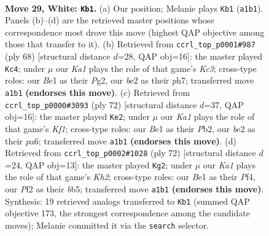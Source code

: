 \documentclass[11pt]{article}
\begin{document}
\clearpage

\begin{figure}[p]\centering
\begin{subfigure}{0.46\textwidth}\centering
\resizebox{\linewidth}{!}{%
\newchessgame
\chessboard[
  setfen={4k3/8/6N1/2pp1p2/3n4/1p6/1P2bP2/K3B2B w - - 0 29},
  showmover=false,
  pgfstyle=straightmove, color=movearrow, markmove={a1-b1}
]}
\caption{}
\end{subfigure}\hfill
\begin{subfigure}{0.46\textwidth}\centering
\resizebox{\linewidth}{!}{%
\newchessgame
\chessboard[
  setfen={8/4p2p/4n3/2p1k1p1/8/1PK1B2P/5PP1/8 w - - 0 35},
  showmover=false,
  pgfstyle=straightmove, color=movearrow, markmove={c3-c4}
]}
\caption{}
\end{subfigure}
\\[4pt]
\begin{subfigure}{0.46\textwidth}\centering
\resizebox{\linewidth}{!}{%
\newchessgame
\chessboard[
  setfen={8/2k4p/pp6/4n3/6p1/4B1P1/PP3P2/5K2 w - - 0 37},
  showmover=false,
  pgfstyle=straightmove, color=movearrow, markmove={f1-e2}
]}
\caption{}
\end{subfigure}\hfill
\begin{subfigure}{0.46\textwidth}\centering
\resizebox{\linewidth}{!}{%
\newchessgame
\chessboard[
  setfen={6k1/1B2pp2/6p1/1bB2n2/1P3P2/7P/7K/8 w - - 2 37},
  showmover=false,
  pgfstyle=straightmove, color=movearrow, markmove={h2-g2}
]}
\caption{}
\end{subfigure}
\caption{\textbf{Move 29, White: \texttt{Kb1}.} (a) Our position; Melanie plays \texttt{Kb1} (\texttt{a1b1}). Panels (b)--(d) are the retrieved master positions whose correspondence most drove this move (highest QAP objective among those that transfer to it). (b) Retrieved from \texttt{ccrl\_top\_p0001\#987} (ply 68) [structural distance $d$=28, QAP obj=16]: the master played \texttt{Kc4}; under $\mu$ our \emph{Ka1} plays the role of that game's \emph{Kc3}; cross-type roles: our \emph{B}e1 as their \emph{P}g2, our \emph{b}e2 as their \emph{p}h7; transferred move \texttt{a1b1} \textbf{(endorses this move)}. (c) Retrieved from \texttt{ccrl\_top\_p0000\#3093} (ply 72) [structural distance $d$=37, QAP obj=16]: the master played \texttt{Ke2}; under $\mu$ our \emph{Ka1} plays the role of that game's \emph{Kf1}; cross-type roles: our \emph{B}e1 as their \emph{P}b2, our \emph{b}e2 as their \emph{p}a6; transferred move \texttt{a1b1} \textbf{(endorses this move)}. (d) Retrieved from \texttt{ccrl\_top\_p0002\#1028} (ply 72) [structural distance $d$=24, QAP obj=13]: the master played \texttt{Kg2}; under $\mu$ our \emph{Ka1} plays the role of that game's \emph{Kh2}; cross-type roles: our \emph{B}e1 as their \emph{P}f4, our \emph{P}f2 as their \emph{b}b5; transferred move \texttt{a1b1} \textbf{(endorses this move)}. Synthesis: 19 retrieved analogs transferred to \texttt{Kb1} (summed QAP objective 173, the strongest correspondence among the candidate moves); Melanie committed it via the \texttt{search} selector.}
\label{fig:thought-m56}
\end{figure}
\end{document}
